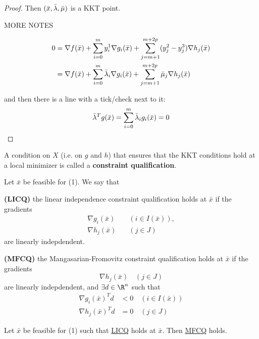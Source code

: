 \begin{proof}
  Then $(\bar x,\bar\lambda,\bar\mu)$ is a KKT point.

  MORE NOTES

  \begin{align*}
    0
     & = \nabla f(\bar x)
    +\sum_{i=0}^my^1_i\nabla g_i(\bar x)
    +\sum_{j=m+1}^{m+2p}(y^2_j-y^3_j)\nabla h_j(\bar x) \\
     & = \nabla f(\bar x)
    +\sum_{i=0}^m \bar\lambda_i\nabla g_i(\bar x)
    +\sum_{j=m+1}^{m+2p}\bar\mu_j\nabla h_j(\bar x)
  \end{align*}

  and then there is a line with a tick/check next to it:
  $$
    \bar\lambda^Tg(\bar x)=\sum_{i=0}^m\bar\lambda_ig_i(\bar x)=0
  $$
\end{proof}

\label{e8fa554}

A condition on $X$ (i.e. on $g$ and $h$) that ensures that the KKT conditions
hold at a local minimizer is called a \textbf{constraint qualification}.

\label{fed784a}

Let $\bar x$ be feasible for (1). We say that
\begin{enumerata}
  \item \textbf{(LICQ)} the linear independence constraint
  qualification holds at $\bar x$ if the gradients
  \begin{align*}
    \nabla g_i(\bar x) & \quad(i\in I(\bar x)), \\
    \nabla h_j(\bar x) & \quad(j\in J)
  \end{align*}
  are linearly indepdendent.
  \item \textbf{(MFCQ)} the Mangasarian-Fromovitz constraint
  qualification holds at $\bar x$ if the gradients
  $$
    \nabla h_j(\bar x)\quad(j\in J)
  $$
  are linearly indepdendent, and $\exists d\in\R^n$ such that
  \begin{align*}
    \nabla g_i(\bar x)^Td & <0\quad(i\in I(\bar x)) \\
    \nabla h_j(\bar x)^Td & =0\quad(j\in J)
  \end{align*}
\end{enumerata}

\label{a7ef3f5}

Let $\bar x$ be feasible for (1) such that \href{fed784a}{LICQ} holds at $\bar
x$. Then \href{fed784a}{MFCQ} holds.


